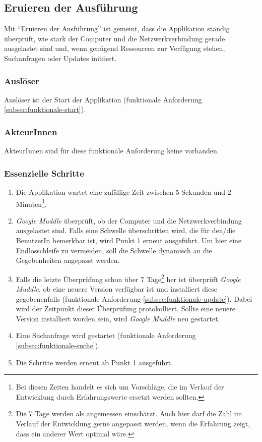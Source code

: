 \subsection{Eruieren der Ausführung}
\label{subsec:funktionale-ausfuehrung}

Mit \enquote{Eruieren der Ausführung} ist gemeint, dass die Applikation ständig
überprüft, wie stark der Computer und die Netzwerkverbindung gerade ausgelastet
sind und, wenn genügend Ressourcen zur Verfügung stehen, Suchanfragen oder
Updates initiiert.

\subsubsection{Auslöser}

Auslöser ist der Start der Applikation (funktionale Anforderung
\ref{subsec:funktionale-start}).

\subsubsection{AkteurInnen}

AkteurInnen sind für diese funktionale Anforderung keine vorhanden.

\subsubsection{Essenzielle Schritte}

\begin{enumerate}
\item Die Applikation wartet eine zufällige Zeit zwischen 5 Sekunden und 2
Minuten\footnote[1]{Bei diesen Zeiten handelt es sich um Vorschläge, die im
Verlauf der Entwicklung durch Erfahrungswerte ersetzt werden sollten.}.
\item \textit{Google Muddle} überprüft, ob der Computer und die
Netzwerkverbindung ausgelastet sind. Falls eine Schwelle überschritten wird, die
für den/die BenutzerIn bemerkbar ist, wird Punkt 1 erneut ausgeführt. Um hier
eine Endlosschleife zu vermeiden, soll die Schwelle dynamisch an die
Gegebenheiten angepasst werden.
\item Falls die letzte Überprüfung schon über 7 Tage\footnote[2]{Die 7 Tage
werden als angemessen einschätzt. Auch hier darf die Zahl im Verlauf der
Entwicklung gerne angepasst werden, wenn die Erfahrung zeigt, dass ein anderer
Wert optimal wäre.} her ist überprüft \textit{Google Muddle}, ob eine neuere
Version verfügbar ist und installiert diese gegebenenfalls (funktionale
Anforderung \ref{subsec:funktionale-update}). Dabei wird der Zeitpunkt dieser
Überprüfung protokolliert. Sollte eine neuere Version installiert worden sein,
wird \textit{Google Muddle} neu gestartet.
\item Eine Suchanfrage wird gestartet (funktionale Anforderung
\ref{subsec:funktionale-suche}).
\item Die Schritte werden erneut ab Punkt 1 ausgeführt.
\end{enumerate}

